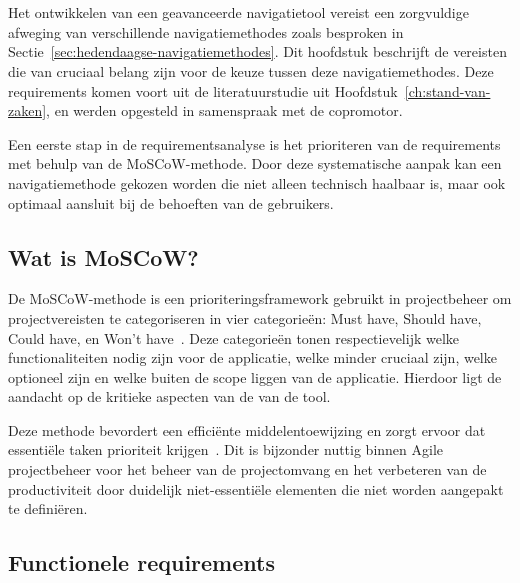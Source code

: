 
\chapter{}%
\label{ch:bepalen-van-de-geschikte-navigatiemethode}


Het ontwikkelen van een geavanceerde navigatietool vereist een zorgvuldige afweging van verschillende navigatiemethodes zoals besproken in Sectie~\ref{sec:hedendaagse-navigatiemethodes}. Dit hoofdstuk beschrijft de vereisten die van cruciaal belang zijn voor de keuze tussen deze navigatiemethodes. Deze requirements komen voort uit de literatuurstudie uit Hoofdstuk~\ref{ch:stand-van-zaken}, en werden opgesteld in samenspraak met de copromotor. 

Een eerste stap in de requirementsanalyse is het prioriteren van de requirements met behulp van de MoSCoW-methode. Door deze systematische aanpak kan een navigatiemethode gekozen worden die niet alleen technisch haalbaar is, maar ook optimaal aansluit bij de behoeften van de gebruikers.

\section{Wat is MoSCoW?}

De MoSCoW-methode is een prioriteringsframework gebruikt in projectbeheer om projectvereisten te categoriseren in vier categorieën: Must have, Should have, Could have, en Won't have~\autocite{Brush2023}. Deze categorieën tonen respectievelijk welke functionaliteiten nodig zijn voor de applicatie, welke minder cruciaal zijn, welke optioneel zijn en welke buiten de scope liggen van de applicatie. Hierdoor ligt de aandacht op de kritieke aspecten van de van de tool.  

Deze methode bevordert een efficiënte middelentoewijzing en zorgt ervoor dat essentiële taken prioriteit krijgen~\autocite{Brush2023}. Dit is bijzonder nuttig binnen Agile projectbeheer voor het beheer van de projectomvang en het verbeteren van de productiviteit door duidelijk niet-essentiële elementen die niet worden aangepakt te definiëren.

\section{Functionele requirements}
\label{sec:functionele-requirements}

